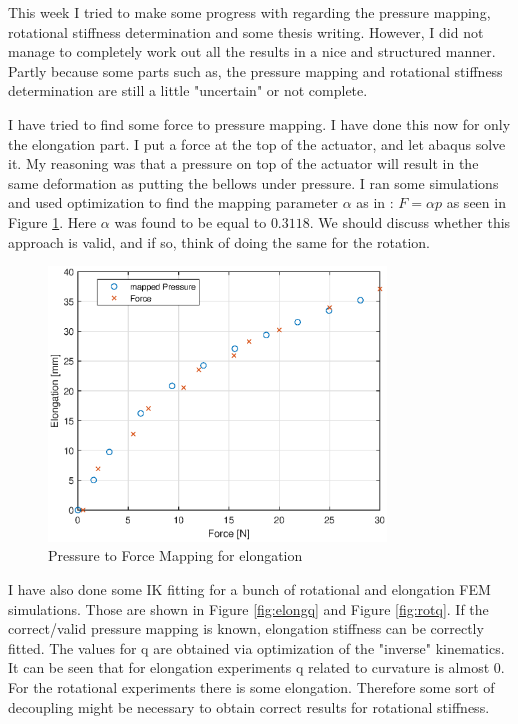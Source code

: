 


This week I tried to make some progress with regarding the pressure mapping, rotational stiffness determination and some thesis writing. However, I did not manage to completely work out all the results in a nice and structured manner. Partly because some parts such as, the pressure mapping and rotational stiffness determination are still a little "uncertain" or not complete. 

I have tried to find some force to pressure mapping. I have done this now for only the elongation part. I put a force at the top of the actuator, and let abaqus solve it. My reasoning was that a pressure on top of the actuator will result in the same deformation as putting the bellows under pressure. I ran some simulations and used optimization to find the mapping parameter $\alpha$ as in : $F = \alpha p$ as seen in Figure \ref{fig:pressure}. Here $\alpha$ was found to be equal to $0.3118$. We should discuss whether this approach is valid, and if so, think of doing the same for the rotation.


\begin{figure}[H]
    \centering
    \includegraphics[width = 0.8\textwidth]{ProgressOverview/forcepressure.eps}
    \caption{Pressure to Force Mapping for elongation}
    \label{fig:pressure}
\end{figure}


I have also done some IK fitting for a bunch of rotational and elongation FEM simulations. Those are shown in Figure \ref{fig:elongq} and Figure \ref{fig:rotq}. If the correct/valid pressure mapping is known, elongation stiffness can be correctly fitted. The values for q are obtained via optimization of the "inverse" kinematics. It can be seen that for elongation experiments q related to curvature is almost 0. For the rotational experiments there is some elongation. Therefore some sort of decoupling might be necessary to obtain correct results for rotational stiffness.


